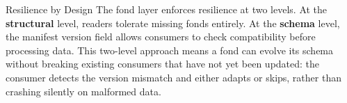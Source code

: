 \documentclass[
  ignorenonframetext,
]{beamer}
\begin{document}
\begin{frame}[allowframebreaks]{Resilience by Design}
\protect{}\label{resilience-by-design}
The fond layer enforces resilience at two levels. At the
\textbf{structural} level, readers tolerate missing fonds entirely. At
the \textbf{schema} level, the manifest version field allows consumers
to check compatibility before processing data. This two-level approach
means a fond can evolve its schema without breaking existing consumers
that have not yet been updated: the consumer detects the version
mismatch and either adapts or skips, rather than crashing silently on
malformed data.
\end{frame}
\end{document}
